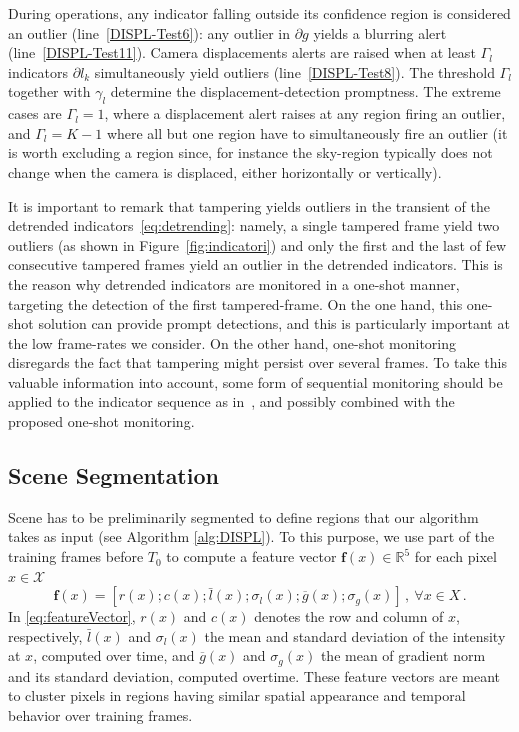 \documentclass{llncs}
\begin{document}
During operations, any indicator falling outside its confidence region is considered an outlier (line~\ref{DISPL-Test6}): any outlier in $\partial g$ yields a blurring alert (line~\ref{DISPL-Test11}). Camera displacements alerts are raised when at least $\Gamma_l$ indicators $\partial l_k$  simultaneously yield outliers (line~\ref{DISPL-Test8}). The threshold $\Gamma_l$ together with $\gamma_l$ determine the displacement-detection promptness. The extreme cases are $\Gamma_l = 1$, where a displacement alert raises at any region firing an outlier, and $\Gamma_l = K-1$ where all but one region have to simultaneously fire an outlier (it is worth excluding a region since, for instance the sky-region typically does not change when the camera is displaced, either horizontally or vertically).

It is important to remark that tampering yields outliers in the transient of the detrended indicators~\eqref{eq:detrending}: namely, a single tampered frame yield two outliers (as shown in Figure~\ref{fig:indicatori}) and only the first and the last of few consecutive tampered frames yield an outlier in the detrended indicators. This is the reason why detrended indicators are monitored in a one-shot manner, targeting the detection of the first tampered-frame. On the one hand, this one-shot solution can provide prompt detections, and this is particularly important at the low frame-rates we consider. On the other hand, one-shot monitoring disregards the fact that tampering might persist over several frames. To take this valuable information into account, some form of sequential monitoring should be applied to the indicator sequence as in~\cite{alippi2010detecting}, and possibly combined with the proposed one-shot monitoring.
%
%
\subsection{Scene Segmentation}\label{subsec:Segmentation}
Scene has to be preliminarily segmented to define regions that our algorithm takes as input (see Algorithm \ref{alg:DISPL}). To this purpose, we use part of the training frames before $T_0$ to compute a feature vector $\textbf{f}(x)\in \mathbb{R}^5$ for each pixel $x\in\mathcal{X}$ 
\begin{equation}
\label{eq:featureVector}
\textbf{f}(x)=\left[r(x);c(x);\bar{l}(x);\sigma_{l}(x);\overline{g}(x);\sigma_{g}(x)\right]\,, \ \forall x \in X\,.
\end{equation}
In \eqref{eq:featureVector}, $r(x)$ and $c(x)$ denotes the row and column of $x$, respectively, $\bar{l}(x)$ and $\sigma_{l}(x)$ the mean and standard deviation of the intensity at $x$, computed over time, and $\overline{g}(x)$ and $\sigma_g(x)$ the mean of gradient norm and its standard deviation, computed overtime. These feature vectors are meant to cluster pixels in regions having similar spatial appearance and temporal behavior over training frames.
\end{document}
